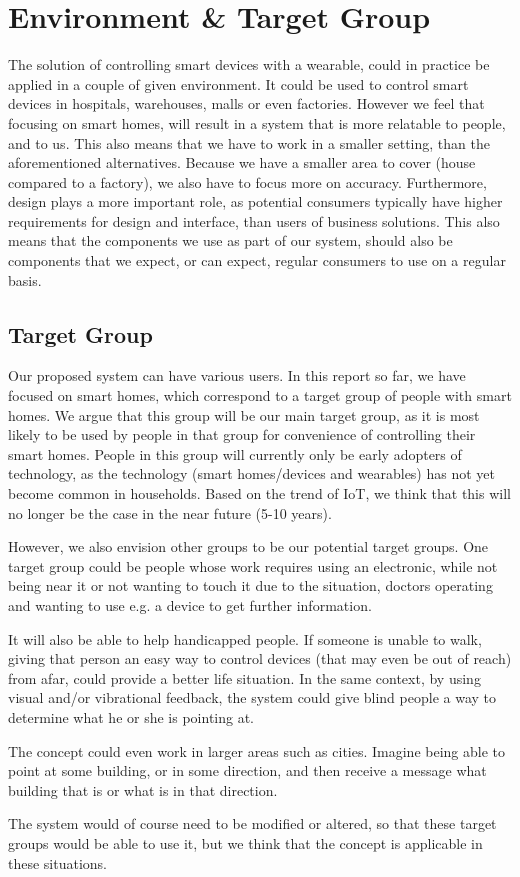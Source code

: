 \section{Environment \& Target Group}
The solution of controlling smart devices with a wearable, 
could in practice be applied in a couple of given environment.
It could be used to control smart devices in \eg hospitals, warehouses, malls or even factories. 
However we feel that focusing on smart homes, 
will result in a system that is more relatable to people, and to us.
This also means that we have to work in a smaller setting,
than the aforementioned alternatives. 
Because we have a smaller area to cover (house compared to \eg a factory),
we also have to focus more on accuracy. 
Furthermore, design plays a more important role,
as potential consumers typically have higher requirements for design and interface,
than users of business solutions. 
This also means that the components we use as part of our system,
should also be components that we expect, or can expect, 
regular consumers to use on a regular basis. 

\subsection{Target Group}
Our proposed system can have various users. 
In this report so far, we have focused on smart homes, 
which correspond to a target group of people with smart homes. 
We argue that this group will be our main target group, 
as it is most likely to be used by people in that group for convenience of controlling their smart homes. 
People in this group will currently only be early adopters of technology, 
as the technology (smart homes/devices and wearables) has not yet become common in households.
Based on the trend of IoT, we think that this will no longer be the case in the near future (5-10 years). 

However, we also envision other groups to be our potential target groups.
One target group could be people whose work requires using an electronic, 
while not being near it or not wanting to touch it due to the situation,
\eg doctors operating and wanting to use e.g. a device to get further information.

It will also be able to help handicapped people. 
If someone is unable to walk, 
giving that person an easy way to control devices (that may even be out of reach) from afar, 
could provide a better life situation. 
In the same context, by using visual and/or vibrational feedback, 
the system could give blind people a way to determine what he or she is pointing at. 

The concept could even work in larger areas such as cities. 
Imagine being able to point at some building, or in some direction, 
and then receive a message what building that is or what is in that direction. 

The system would of course need to be modified or altered, 
so that these target groups would be able to use it, 
but we think that the concept is applicable in these situations. 